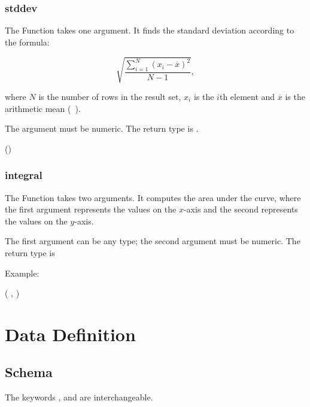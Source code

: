 
\subsubsection{stddev}
The Function takes one argument.
It finds the standard deviation according to the formula:

\[
\sqrt{\frac{\sum_{i=1}^{N}{(x_i - \overline{x})^2}}{N-1}},
\]

where $N$ is the number of rows in the result set,
$x_i$ is the $i$th element and $\overline{x}$ is
the arithmetic mean (\ie\ ).

The argument must be numeric.
The return type is .

 ()
 


\subsubsection{integral}
The Function takes two arguments.
It computes the area under the curve,
where the first argument represents
the values on the $x$-axis and
the second represents the values
on the $y$-axis.

The first argument can be any type;
the second argument must be numeric.
The return type is 

Example:

 (
, )
 


\section{Data Definition}

\subsection{Schema}
The keywords
,  and 
are interchangeable.

